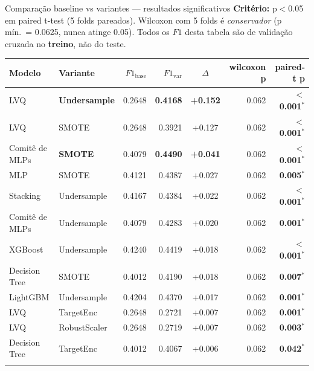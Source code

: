 \documentclass[aspectratio=169]{beamer}
\begin{document}
\begin{frame}[shrink=20]{Comparação baseline vs variantes — resultados significativos}
\textbf{Critério:} p$<$0.05 em paired t-test (5 folds pareados). Wilcoxon com 5 folds é \emph{conservador} (p mín.\ = 0.0625, nunca atinge 0.05). \alert{Todos os $F1$ desta tabela são de validação cruzada no \textbf{treino}, não do teste.}

\vspace{0.2em}
\centering
\tiny
\begin{tabular}{llrrcrr}
\toprule
\textbf{Modelo} & \textbf{Variante} & $F1_{\text{base}}$ & $F1_{\text{var}}$ & $\Delta$ & wilcoxon p & paired-t p \\
\midrule
\rowcolor{green!10}
LVQ           & \textbf{Undersample} & 0.2648 & \textbf{0.4168} & \textbf{+0.152} & 0.062 & \textbf{$<$0.001}$^{*}$ \\
\rowcolor{green!10}
LVQ           & SMOTE        & 0.2648 & 0.3921 & +0.127 & 0.062 & \textbf{$<$0.001}$^{*}$ \\
\rowcolor{green!20}
Comitê de MLPs & \textbf{SMOTE} & 0.4079 & \textbf{0.4490} & \textbf{+0.041} & 0.062 & \textbf{$<$0.001}$^{*}$ \\
\rowcolor{green!10}
MLP           & SMOTE        & 0.4121 & 0.4387 & +0.027 & 0.062 & \textbf{0.005}$^{*}$ \\
\rowcolor{green!10}
Stacking      & Undersample  & 0.4167 & 0.4384 & +0.022 & 0.062 & \textbf{$<$0.001}$^{*}$ \\
\rowcolor{green!10}
Comitê de MLPs & Undersample & 0.4079 & 0.4283 & +0.020 & 0.062 & \textbf{0.001}$^{*}$ \\
\rowcolor{green!10}
XGBoost       & Undersample  & 0.4240 & 0.4419 & +0.018 & 0.062 & \textbf{$<$0.001}$^{*}$ \\
\rowcolor{green!10}
Decision Tree & SMOTE        & 0.4012 & 0.4190 & +0.018 & 0.062 & \textbf{0.007}$^{*}$ \\
\rowcolor{green!10}
LightGBM      & Undersample  & 0.4204 & 0.4370 & +0.017 & 0.062 & \textbf{0.001}$^{*}$ \\
\rowcolor{green!10}
LVQ           & TargetEnc    & 0.2648 & 0.2721 & +0.007 & 0.062 & \textbf{0.001}$^{*}$ \\
\rowcolor{green!10}
LVQ           & RobustScaler & 0.2648 & 0.2719 & +0.007 & 0.062 & \textbf{0.003}$^{*}$ \\
\rowcolor{green!10}
Decision Tree & TargetEnc    & 0.4012 & 0.4067 & +0.006 & 0.062 & \textbf{0.042}$^{*}$ \\
\rowcolor{green!10}

\end{tabular}
\end{frame}
\end{document}
